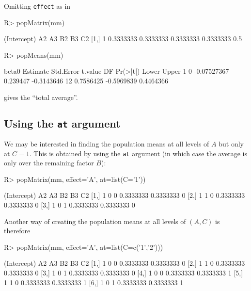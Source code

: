 \documentclass[11pt]{article}
\def\code#1{\texttt{#1}}
\begin{document}
Omitting \code{effect} as in

\begin{Schunk}
\begin{Sinput}
R> popMatrix(mm)
\end{Sinput}
\begin{Soutput}
     (Intercept)        A2        A3        B2        B3  C2
[1,]           1 0.3333333 0.3333333 0.3333333 0.3333333 0.5
\end{Soutput}
\begin{Sinput}
R> popMeans(mm)
\end{Sinput}
\begin{Soutput}
  beta0    Estimate Std.Error    t.value DF  Pr(>|t|)      Lower     Upper
1     0 -0.07527367  0.239447 -0.3143646 12 0.7586425 -0.5969839 0.4464366
\end{Soutput}
\end{Schunk}
gives the ``total average''.


\subsection{Using the \code{at} argument}

We may be interested in finding the population means
at all levels of  $A$
but only at $C=1$. This is obtained by using the \code{at} argument
(in which case the average is only over the remaining factor $B$):

\begin{Schunk}
\begin{Sinput}
R> popMatrix(mm, effect='A', at=list(C='1'))
\end{Sinput}
\begin{Soutput}
     (Intercept) A2 A3        B2        B3 C2
[1,]           1  0  0 0.3333333 0.3333333  0
[2,]           1  1  0 0.3333333 0.3333333  0
[3,]           1  0  1 0.3333333 0.3333333  0
\end{Soutput}
\end{Schunk}

Another way of
creating the population means
at  all levels of $(A,C)$ is therefore
\begin{Schunk}
\begin{Sinput}
R> popMatrix(mm, effect='A', at=list(C=c('1','2')))
\end{Sinput}
\begin{Soutput}
     (Intercept) A2 A3        B2        B3 C2
[1,]           1  0  0 0.3333333 0.3333333  0
[2,]           1  1  0 0.3333333 0.3333333  0
[3,]           1  0  1 0.3333333 0.3333333  0
[4,]           1  0  0 0.3333333 0.3333333  1
[5,]           1  1  0 0.3333333 0.3333333  1
[6,]           1  0  1 0.3333333 0.3333333  1
\end{Soutput}
\end{Schunk}
\end{document}
